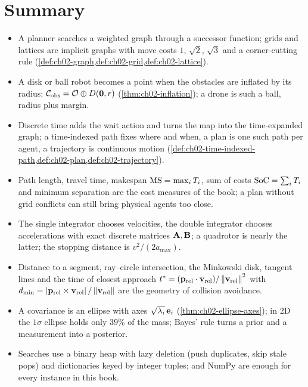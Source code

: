 \section{Summary}
\begin{summary}
\begin{itemize}
  \item A planner searches a weighted graph through a successor function; grids and lattices are implicit graphs with move costs $1$, $\sqrt2$, $\sqrt3$ and a corner-cutting rule (\cref{def:ch02-graph,def:ch02-grid,def:ch02-lattice}).
  \item A disk or ball robot becomes a point when the obstacles are inflated by its radius: $\mathcal{C}_{\mathrm{obs}}=\mathcal{O}\oplus D(\mathbf{0},r)$ (\cref{thm:ch02-inflation}); a drone is such a ball, radius plus margin.
  \item Discrete time adds the wait action and turns the map into the time-expanded graph; a time-indexed path fixes where and when, a plan is one such path per agent, a trajectory is continuous motion (\cref{def:ch02-time-indexed-path,def:ch02-plan,def:ch02-trajectory}).
  \item Path length, travel time, makespan $\mathrm{MS}=\max_i T_i$, sum of costs $\mathrm{SoC}=\sum_i T_i$ and minimum separation are the cost measures of the book; a plan without grid conflicts can still bring physical agents too close.
  \item The single integrator chooses velocities, the double integrator chooses accelerations with exact discrete matrices $\mathbf{A},\mathbf{B}$; a quadrotor is nearly the latter; the stopping distance is $v^2/(2a_{\max})$.
  \item Distance to a segment, ray--circle intersection, the Minkowski disk, tangent lines and the time of closest approach $t^*=(\mathbf{p}_{\mathrm{rel}}\cdot\mathbf{v}_{\mathrm{rel}})/\left\lVert \mathbf{v}_{\mathrm{rel}} \right\rVert^2$ with $d_{\min}=\left\lvert \mathbf{p}_{\mathrm{rel}}\times\mathbf{v}_{\mathrm{rel}} \right\rvert/\left\lVert \mathbf{v}_{\mathrm{rel}} \right\rVert$ are the geometry of collision avoidance.
  \item A covariance is an ellipse with axes $\sqrt{\lambda_i}\,\mathbf{e}_i$ (\cref{thm:ch02-ellipse-axes}); in 2D the $1\sigma$ ellipse holds only $39\%$ of the mass; Bayes' rule turns a prior and a measurement into a posterior.
  \item Searches use a binary heap with lazy deletion (push duplicates, skip stale pops) and dictionaries keyed by integer tuples; \python and NumPy are enough for every instance in this book.
\end{itemize}
\end{summary}

